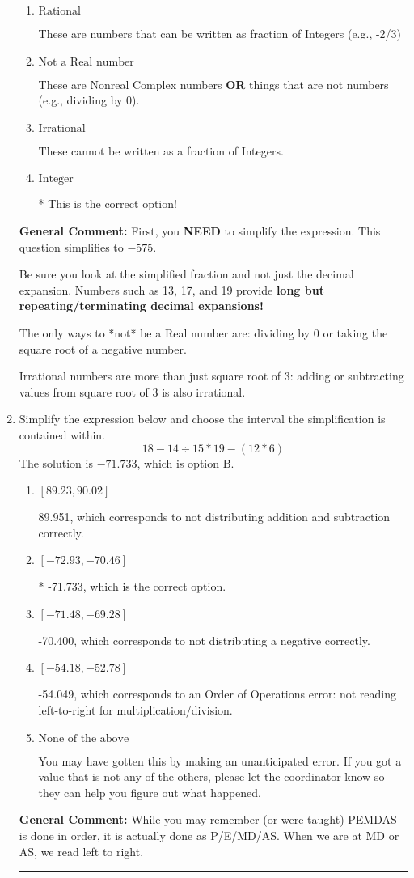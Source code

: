 \documentclass{extbook}[14pt]
\newcommand{\litem}[1]{\item #1

\rule{\textwidth}{0.4pt}}
\begin{document}
\begin{enumerate}
{\begin{enumerate}[label=\Alph*.]
These are the counting numbers with 0 (0, 1, 2, 3, ...)
\item \( \text{Rational} \)

These are numbers that can be written as fraction of Integers (e.g., -2/3)
\item \( \text{Not a Real number} \)

These are Nonreal Complex numbers \textbf{OR} things that are not numbers (e.g., dividing by 0).
\item \( \text{Irrational} \)

These cannot be written as a fraction of Integers.
\item \( \text{Integer} \)

* This is the correct option!
\end{enumerate}

\textbf{General Comment:} First, you \textbf{NEED} to simplify the expression. This question simplifies to $-575$. 
 
 Be sure you look at the simplified fraction and not just the decimal expansion. Numbers such as 13, 17, and 19 provide \textbf{long but repeating/terminating decimal expansions!} 
 
 The only ways to *not* be a Real number are: dividing by 0 or taking the square root of a negative number. 
 
 Irrational numbers are more than just square root of 3: adding or subtracting values from square root of 3 is also irrational.
}
\litem{
Simplify the expression below and choose the interval the simplification is contained within.
\[ 18 - 14 \div 15 * 19 - (12 * 6) \]The solution is \( -71.733 \), which is option B.\begin{enumerate}[label=\Alph*.]
\item \( [89.23, 90.02] \)

 89.951, which corresponds to not distributing addition and subtraction correctly.
\item \( [-72.93, -70.46] \)

* -71.733, which is the correct option.
\item \( [-71.48, -69.28] \)

 -70.400, which corresponds to not distributing a negative correctly.
\item \( [-54.18, -52.78] \)

 -54.049, which corresponds to an Order of Operations error: not reading left-to-right for multiplication/division.
\item \( \text{None of the above} \)

 You may have gotten this by making an unanticipated error. If you got a value that is not any of the others, please let the coordinator know so they can help you figure out what happened.
\end{enumerate}

\textbf{General Comment:} While you may remember (or were taught) PEMDAS is done in order, it is actually done as P/E/MD/AS. When we are at MD or AS, we read left to right.
}
\end{enumerate}
\end{document}
